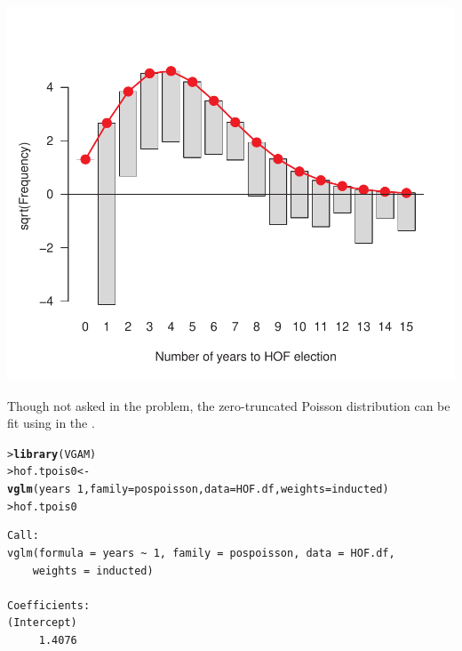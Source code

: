 \documentclass[10pt]{report}\usepackage[]{graphicx}\usepackage[]{color}
\makeatletter
\newcommand{\hlnum}[1]{\textcolor[rgb]{0.686,0.059,0.569}{#1}}%
\newcommand{\hlopt}[1]{\textcolor[rgb]{0,0,0}{#1}}%
\newcommand{\hlstd}[1]{\textcolor[rgb]{0.345,0.345,0.345}{#1}}%
\newcommand{\hlkwb}[1]{\textcolor[rgb]{0.69,0.353,0.396}{#1}}%
\newcommand{\hlkwc}[1]{\textcolor[rgb]{0.333,0.667,0.333}{#1}}%
\newcommand{\hlkwd}[1]{\textcolor[rgb]{0.737,0.353,0.396}{\textbf{#1}}}%
\newenvironment{kframe}{%
 \def\at@end@of@kframe{}%
 \ifinner\ifhmode%
  \def\at@end@of@kframe{\end{minipage}}%
  \begin{minipage}{\columnwidth}%
 \fi\fi%
 \def\FrameCommand##1{\hskip\@totalleftmargin \hskip-\fboxsep
 \colorbox{shadecolor}{##1}\hskip-\fboxsep
     \hskip-\linewidth \hskip-\@totalleftmargin \hskip\columnwidth}%
 \MakeFramed {\advance\hsize-\width
   \@totalleftmargin\z@ \linewidth\hsize
   \@setminipage}}%
 {\par\unskip\endMakeFramed%
 \at@end@of@kframe}
\newenvironment{knitrout}{}{} %
\renewenvironment{knitrout}{\small\renewcommand{\baselinestretch}{.85}}{} %
\makeatother
\begin{document}
\begin{Exercises}
\begin{enumerate*}
\begin{ans}
\begin{knitrout}
\centerline{\includegraphics[width=.5\textwidth]{soln/fig/ex3_12c-1} }



\end{knitrout}
      Though not asked in the problem, the zero-truncated Poisson distribution can be fit using 
      in the . %
\begin{knitrout}\footnotesize
{}\color{fgcolor}\begin{kframe}
\begin{alltt}
\hlstd{> }\hlkwd{library}\hlstd{(VGAM)}
\hlstd{> }\hlstd{hof.tpois0} \hlkwb{<-} \hlkwd{vglm}\hlstd{(years} \hlopt{~} \hlnum{1}\hlstd{,} \hlkwc{family}\hlstd{=pospoisson,} \hlkwc{data}\hlstd{=HOF.df,} \hlkwc{weights}\hlstd{=inducted)}
\hlstd{> }\hlstd{hof.tpois0}
\end{alltt}
\begin{verbatim}
Call:
vglm(formula = years ~ 1, family = pospoisson, data = HOF.df, 
    weights = inducted)

Coefficients:
(Intercept) 
     1.4076 


\end{verbatim}
\end{kframe}
\end{knitrout}
\end{ans}
\end{enumerate*}
\end{Exercises}
\end{document}
